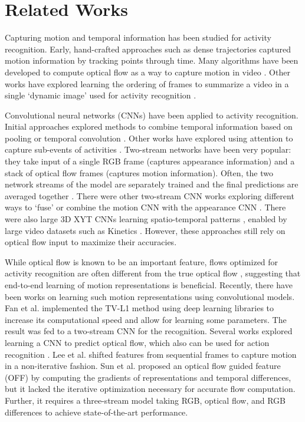 \documentclass[10pt,twocolumn,letterpaper]{article}
\begin{document}
\section{Related Works}
Capturing motion and temporal information has been studied for activity recognition. Early, hand-crafted approaches such as dense trajectories \cite{wang2011action} captured motion information by tracking points through time. Many algorithms have been developed to compute optical flow as a way to capture motion in video \cite{fortun2015optical}. Other works have explored learning the ordering of frames to summarize a video in a single `dynamic image' used for activity recognition \cite{bilen2016dynamic}.

Convolutional neural networks (CNNs) have been applied to activity recognition. Initial approaches explored methods to combine temporal information based on pooling or temporal convolution \cite{karpathy2014large,ng2015beyond}. Other works have explored using attention to capture sub-events of activities \cite{piergiovanni2017learning}. Two-stream networks have been very popular: they take input of a single RGB frame (captures appearance information) and a stack of optical flow frames (captures motion information). Often, the two network streams of the model are separately trained and the final predictions are averaged together \cite{simonyan2014two}. There were other two-stream CNN works exploring different ways to `fuse' or combine the motion CNN with the appearance CNN \cite{feichtenhofer2016convolutional,feichtenhofer2016spatiotemporal}.
There were also large 3D XYT CNNs learning spatio-temporal patterns \cite{xie2017rethinking,carreira2017quo}, enabled by large video datasets such as Kinetics \cite{kay2017kinetics}.
However, these approaches still rely on optical flow input to maximize their accuracies.

While optical flow is known to be an important feature, flows optimized for activity recognition are often different from the true optical flow \cite{sevilla2018integration}, suggesting that end-to-end learning of motion representations is beneficial. Recently, there have been works on learning such motion representations using convolutional models. Fan et al. \cite{fan2018end} implemented the TV-L1 method using deep learning libraries to increase its computational speed and allow for learning some parameters. The result was fed to a two-stream CNN for the recognition. Several works explored learning a CNN to predict optical flow, which also can be used for action recognition \cite{dosovitskiy2015flownet,gao2017im2flow,hui2018liteflownet,ng2018actionflownet,sun2018optical}. Lee et al. \cite{lee2018motion} shifted features from sequential frames to capture motion in a non-iterative fashion. Sun et al. \cite{sun2018optical} proposed an optical flow guided feature (OFF) by computing the gradients of representations and temporal differences, but it lacked the iterative optimization necessary for accurate flow computation. Further, it requires a three-stream model taking RGB, optical flow, and RGB differences to achieve state-of-the-art performance.
\end{document}
